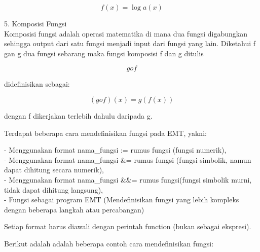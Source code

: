\documentclass[a4paper,10pt]{article}
\begin{document}
\begin{eulernotebook}
\begin{eulercomment}
\begin{eulercomment}
\begin{eulercomment}
\begin{eulercomment}
\begin{eulercomment}
\begin{eulercomment}
\begin{eulercomment}
\begin{eulercomment}
\begin{eulercomment}
\begin{eulercomment}
\begin{eulercomment}
\begin{eulercomment}
\begin{eulercomment}
\begin{eulercomment}
\begin{eulercomment}
\begin{eulercomment}
\begin{eulercomment}
\end{eulercomment}
\begin{eulerformula}
\[
f(x)= \log a(x)
\]
\end{eulerformula}
\begin{eulercomment}
5. Komposisi Fungsi\\
Komposisi fungsi adalah operasi matematika di mana dua fungsi
digabungkan sehingga output dari satu fungsi menjadi input dari fungsi
yang lain. Diketahui f gan g dua fungsi sebarang maka fungsi komposisi
f dan g ditulis\\
\end{eulercomment}
\begin{eulerformula}
\[
g o f
\]
\end{eulerformula}
\begin{eulercomment}
didefinisikan sebagai:

\end{eulercomment}
\begin{eulerformula}
\[
(g o f)(x) = g(f(x))
\]
\end{eulerformula}
\begin{eulercomment}
dengan f dikerjakan terlebih dahulu daripada g.

\end{eulercomment}
\begin{eulercomment}
Terdapat beberapa cara mendefinisikan fungsi pada EMT, yakni:

- Menggunakan format nama\_fungsi := rumus fungsi (fungsi numerik),\\
- Menggunakan format nama\_fungsi \&= rumus fungsi (fungsi simbolik,
namun dapat dihitung secara numerik),\\
- Menggunakan format nama\_fungsi \&\&= rumus fungsi(fungsi simbolik
murni, tidak dapat dihitung langsung),\\
- Fungsi sebagai program EMT (Mendefinisikan fungsi yang lebih
kompleks dengan beberapa langkah atau percabangan)

Setiap format harus diawali dengan perintah function (bukan sebagai
ekspresi).


Berikut adalah adalah beberapa contoh cara mendefinisikan fungsi:


\end{eulercomment}
\end{eulercomment}
\end{eulercomment}
\end{eulercomment}
\end{eulercomment}
\end{eulercomment}
\end{eulercomment}
\end{eulercomment}
\end{eulercomment}
\end{eulercomment}
\end{eulercomment}
\end{eulercomment}
\end{eulercomment}
\end{eulercomment}
\end{eulercomment}
\end{eulercomment}
\end{eulercomment}
\end{eulernotebook}
\end{document}
